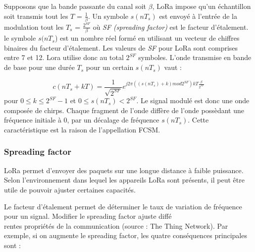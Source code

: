 \vspace{0.1cm}

Supposons que la bande passante du canal soit $\beta$, LoRa impose qu'un échan\-tillon soit transmis tout les $T$ = $\frac{1}{\beta}$. Un symbole $s(nT_s)$ est envoyé à l'entrée de la modulation tout les $T_s$ = $\frac{2^{SF}}{\beta}$ où \textit{SF (spreading factor)} est le facteur d'étalement. le symbole $s(nT_s$) est un nombre réel formé en utilisant un vecteur de chiffres binaires du facteur d'étalement. Les valeurs de \textit{SF} pour LoRa sont comprises entre 7 et 12. Lora utilise donc au total $2^{SF}$ symboles. L'onde transmise en bande de base pour une durée $T_s$ pour un certain $s(nT_s)$ vaut :

\begin{equation}
c(nT_s + kT) = \frac{1}{\sqrt{2^{SF}}} e^{j2\pi ((s(nT_s) +k )mod 2^{SF})kT \frac{\beta}{2^{SF}}}
\end{equation}
pour $0 \leq k \leq 2^{SF}-1$ et $0 \leq s(nT_s) < 2^{SF}$.
Le signal modulé est donc une onde composée de chirps. Chaque fragment de l'onde diffère de l'onde possèdant une fréquence initiale à 0, par un décalage de fréquence $s(nT_s)$. Cette caractéristique est la raison de l'appellation FCSM.


\subsubsection{Spreading factor}

LoRa permet d'envoyer des paquets sur une longue distance à faible puissance. Selon l'environnement dans lequel les appareils LoRa sont présents, il peut être utile de pouvoir ajuster certaines capacités.

\vspace{0.1cm}

Le facteur d'étalement permet de déterminer le taux de variation de fréquence pour un signal. Modifier le spreading factor ajuste diffé \\ rentes propriétés de la communication (source : The Thing Network\cite{thethingsnetworkSF}). Par exemple, si on augmente le spreading factor, les quatre conséquences principales sont :

\vspace{0.1cm}

